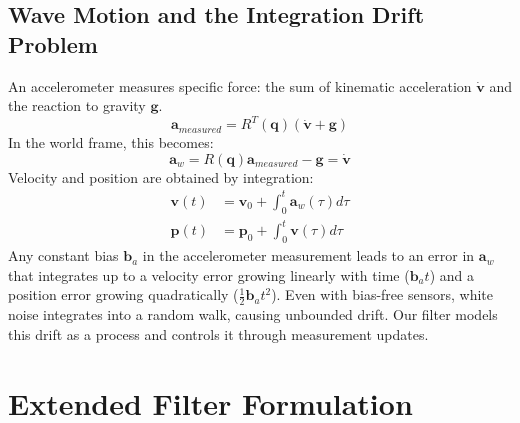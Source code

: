 \documentclass[11pt]{article}
\begin{document}
\subsection{Wave Motion and the Integration Drift Problem}
An accelerometer measures specific force: the sum of kinematic acceleration $\dot{\bm{v}}$ and the reaction to gravity $\bm{g}$.
\begin{equation}
\bm{a}_{measured} = R^T(\bm{q})(\dot{\bm{v}} + \bm{g})
\end{equation}
In the world frame, this becomes:
\begin{equation}
\bm{a}_{w} = R(\bm{q}) \bm{a}_{measured} - \bm{g} = \dot{\bm{v}}
\end{equation}
Velocity and position are obtained by integration:
\begin{align}
\bm{v}(t) &= \bm{v}_0 + \int_0^t \bm{a}_{w}(\tau)  d\tau \\
\bm{p}(t) &= \bm{p}_0 + \int_0^t \bm{v}(\tau)  d\tau
\end{align}
Any constant bias $\bm{b}_a$ in the accelerometer measurement leads to an error in $\bm{a}_w$ that integrates up to a velocity error growing linearly with time ($\bm{b}_a t$) and a position error growing quadratically ($\frac{1}{2}\bm{b}_a t^2$). Even with bias-free sensors, white noise integrates into a random walk, causing unbounded drift. Our filter models this drift as a process and controls it through measurement updates.

\section{Extended Filter Formulation}
\label{sec:formulation}
\end{document}
